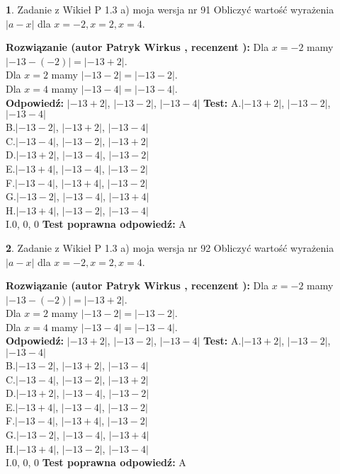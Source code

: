 \documentclass[12pt, a4paper]{article}
\theoremstyle{definition} %
\newtheorem{zad}{}
\newcommand{\zadStart}[1]{\begin{zad}#1\newline}
\newcommand{\zadStop}{\end{zad}}
\newcommand{\rozwStart}[2]{\noindent \textbf{Rozwiązanie (autor #1 , recenzent #2): }\newline}
\newcommand{\rozwStop}{\newline}
\newcommand{\odpStart}{\noindent \textbf{Odpowiedź:}\newline}
\newcommand{\odpStop}{\newline}
\newcommand{\testStart}{\noindent \textbf{Test:}\newline}
\newcommand{\testStop}{\newline}
\newcommand{\kluczStart}{\noindent \textbf{Test poprawna odpowiedź:}\newline}
\newcommand{\kluczStop}{\newline}
\begin{document}
\zadStart{Zadanie z Wikieł P 1.3 a) moja wersja nr 91}
Obliczyć wartość wyrażenia $|a - x|$ dla $x=-2,x=2,x=4$.
\zadStop
\rozwStart{Patryk Wirkus}{}
Dla $x = -2$ mamy $|-13 - (-2)| = |-13 + 2|$.\\
Dla $x = 2$ mamy $|-13 - 2| = |-13 - 2|$.\\
Dla $x = 4$ mamy $|-13 - 4| = |-13 - 4|$.\\
\rozwStop
\odpStart
$|-13 + 2|$, $|-13 - 2|$, $|-13 - 4|$
\odpStop
\testStart
A.$|-13 + 2|$, $|-13 - 2|$, $|-13 - 4|$\\
B.$|-13 - 2|$, $|-13 + 2|$, $|-13 - 4|$\\
C.$|-13 - 4|$, $|-13 - 2|$, $|-13 + 2|$\\
D.$|-13 + 2|$, $|-13 - 4|$, $|-13 - 2|$\\
E.$|-13 + 4|$, $|-13 - 4|$, $|-13 - 2|$\\
F.$|-13 - 4|$, $|-13 + 4|$, $|-13 - 2|$\\
G.$|-13 - 2|$, $|-13 - 4|$, $|-13 + 4|$\\
H.$|-13 + 4|$, $|-13 - 2|$, $|-13 - 4|$\\
I.$0$, $0$, $0$
\testStop
\kluczStart
A
\kluczStop



\zadStart{Zadanie z Wikieł P 1.3 a) moja wersja nr 92}
Obliczyć wartość wyrażenia $|a - x|$ dla $x=-2,x=2,x=4$.
\zadStop
\rozwStart{Patryk Wirkus}{}
Dla $x = -2$ mamy $|-13 - (-2)| = |-13 + 2|$.\\
Dla $x = 2$ mamy $|-13 - 2| = |-13 - 2|$.\\
Dla $x = 4$ mamy $|-13 - 4| = |-13 - 4|$.\\
\rozwStop
\odpStart
$|-13 + 2|$, $|-13 - 2|$, $|-13 - 4|$
\odpStop
\testStart
A.$|-13 + 2|$, $|-13 - 2|$, $|-13 - 4|$\\
B.$|-13 - 2|$, $|-13 + 2|$, $|-13 - 4|$\\
C.$|-13 - 4|$, $|-13 - 2|$, $|-13 + 2|$\\
D.$|-13 + 2|$, $|-13 - 4|$, $|-13 - 2|$\\
E.$|-13 + 4|$, $|-13 - 4|$, $|-13 - 2|$\\
F.$|-13 - 4|$, $|-13 + 4|$, $|-13 - 2|$\\
G.$|-13 - 2|$, $|-13 - 4|$, $|-13 + 4|$\\
H.$|-13 + 4|$, $|-13 - 2|$, $|-13 - 4|$\\
I.$0$, $0$, $0$
\testStop
\kluczStart
A
\kluczStop
\end{document}
